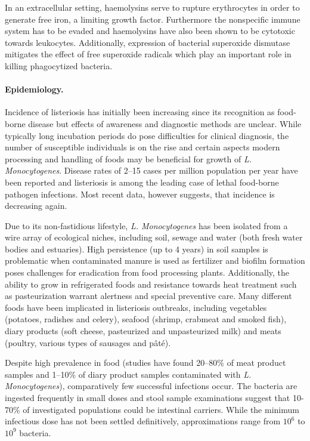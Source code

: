 In an extracellular setting, haemolysins serve to rupture erythrocytes in order to generate free iron, a limiting growth factor. Furthermore the nonspecific immune system has to be evaded and haemolysins have also been shown to be cytotoxic towards leukocytes. Additionally, expression of bacterial superoxide dismutase mitigates the effect of free superoxide radicals which play an important role in killing phagocytized bacteria.

\paragraph{Epidemiology.}
Incidence of listeriosis has initially been increasing since its recognition as food-borne disease but effects of awareness and diagnostic methods are unclear. While typically long incubation periods do pose difficulties for clinical diagnosis, the number of susceptible individuals is on the rise and certain aspects modern processing and handling of foods may be beneficial for growth of \textit{L. Monocytogenes}. Disease rates of 2--15 cases per million population per year have been reported and listeriosis is among the leading case of lethal food-borne pathogen infections. Most recent data, however suggests, that incidence is decreasing again.

Due to its non-fastidious lifestyle, \textit{L. Monocytogenes} has been isolated from a wire array of ecological niches, including soil, sewage and water (both fresh water bodies and estuaries). High persistence (up to 4 years) in soil samples is problematic when contaminated manure is used as fertilizer and biofilm formation poses challenges for eradication from food processing plants. Additionally, the ability to grow in refrigerated foods and resistance towards heat treatment such as pasteurization warrant alertness and special preventive care. Many different foods have been implicated in listeriosis outbreaks, including vegetables (potatoes, radishes and celery), seafood (shrimp, crabmeat and smoked fish), diary products (soft cheese, pasteurized and unpasteurized milk) and meats (poultry, various types of sausages and pâté).

Despite high prevalence in food (studies have found 20--80\% of meat product samples and 1--10\% of diary product samples contaminated with \textit{L. Monocytogenes}), comparatively few successful infections occur. The bacteria are ingested frequently in small doses and stool sample examinations suggest that 10-70\% of investigated populations could be intestinal carriers. While the minimum infectious dose has not been settled definitively, approximations range from $10^6$ to $10^9$ bacteria.

